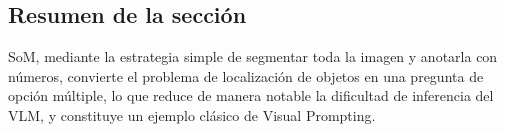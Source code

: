 \subsection{Resumen de la sección}

SoM, mediante la estrategia simple de segmentar toda la imagen y anotarla con números, convierte el problema de localización de objetos en una pregunta de opción múltiple, lo que reduce de manera notable la dificultad de inferencia del VLM, y constituye un ejemplo clásico de Visual Prompting.

